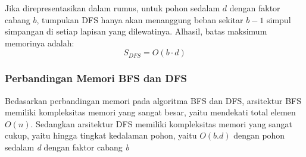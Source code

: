 \documentclass[12pt]{article}
\begin{document}
Jika direpresentasikan dalam rumus, untuk pohon sedalam $d$ dengan faktor cabang $b$, tumpukan DFS hanya akan menanggung beban sekitar $b - 1$ simpul simpangan di setiap lapisan yang dilewatinya. Alhasil, batas maksimum memorinya adalah:
\[
S_{DFS} = O(b \cdot d)
\]

\subsubsection{Perbandingan Memori BFS dan DFS}

Bedasarkan perbandingan memori pada algoritma BFS dan DFS, arsitektur BFS memiliki kompleksitas memori yang sangat besar, yaitu mendekati  total elemen $O(n)$. Sedangkan arsitektur DFS memiliki kompleksitas memori yang sangat cukup, yaitu hingga tingkat kedalaman pohon, yaitu $O(b.d)$ dengan pohon sedalam \textit{d} dengan faktor cabang \textit{b} 
\end{document}
